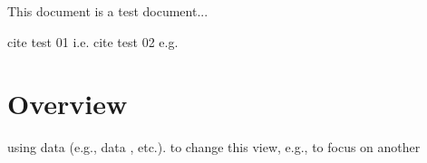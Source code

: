 \documentclass{article}
\begin{document}
This document is a test document...

cite test 01 i.e.
cite test 02 e.g.


\section{Overview}


using data (e.g., data , etc.).
to change this view, e.g., to focus on another
\end{document}
